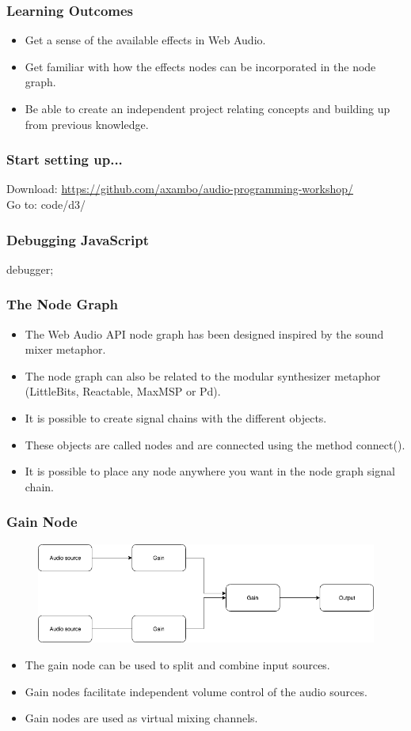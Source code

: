 \documentclass[screen, aspectratio=43]{beamer}
\begin{document}
%
\begin{frame}
\frametitle{Learning Outcomes}
\begin{itemize}
\item Get a sense of the available effects in Web Audio.
\item Get familiar with how the effects nodes can be incorporated in the node graph.
\item Be able to create an independent project relating concepts and building up from previous knowledge.
\end{itemize}
\end{frame}
%
\begin{frame}
\frametitle{Start setting up...}
Download: \url{https://github.com/axambo/audio-programming-workshop/} 
\\
\vspace{10 mm}
Go to: \textrm{code/d3/}
\end{frame}
%	
\begin{frame}
\frametitle{Debugging JavaScript}
 \textrm{debugger;} 
\end{frame}
%
\begin{frame}
\frametitle{The Node Graph}
\begin{itemize}
\item The Web Audio API node graph has been designed inspired by the sound mixer metaphor. 
\item The node graph can also be related to the modular synthesizer metaphor (LittleBits, Reactable, MaxMSP or Pd).
\item It is possible to create signal chains with the different objects.
\item These objects are called nodes and are connected using the method \textrm{connect()}.
\item It is possible to place any node anywhere you want in the node graph signal chain.
\end{itemize}
\end{frame}
%
\begin{frame}
\frametitle{Gain Node}
   \begin{figure}
	\includegraphics[scale=0.35]{img/Routing-audio-nodes-01-two-oscillators.png}
\end{figure}
\begin{itemize}
\item The gain node can be used to split and combine input sources.
\item Gain nodes facilitate independent volume control of the audio sources.
\item Gain nodes are used as virtual mixing channels.
\end{itemize}
\end{frame}
\end{document}
